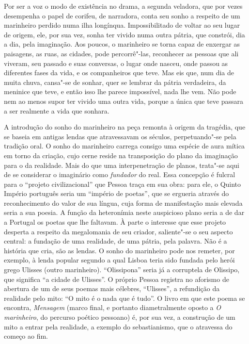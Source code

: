 Por ser a voz o modo de existência no drama,
a segunda veladora, que por
vezes desempenha o papel de corifeu,
de narradora, conta seu sonho a
respeito de um marinheiro perdido numa
ilha longínqua. Impossibilitado
de voltar ao seu lugar de origem, ele, por
sua vez, sonha ter vivido
numa outra pátria, que constrói, dia a dia, pela imaginação. Aos
poucos, o marinheiro se torna capaz de enxergar
as paisagens, as ruas,
as cidades, pode percorrê"-las, 
reconhecer as pessoas que ali viveram,
seu passado e suas conversas, o lugar onde nasceu, onde passou as
diferentes fases da vida, e os companheiros
que teve. Mas eis que, num
dia de muita chuva, cansa"-se de sonhar, quer se lembrar da pátria
verdadeira, da meninice que teve, e então isso
lhe parece impossível,
nada lhe vem. Não pode nem ao menos 
supor ter vivido uma outra vida,
porque a única que teve passara a
ser realmente a vida que sonhara. 

A introdução do sonho do marinheiro na peça remonta à
origem da tragédia, que se baseia em antigas lendas 
que atravessavam os
séculos, perpetuando"-se pela tradição oral.
O sonho do marinheiro
carrega consigo uma espécie de aura mítica
em torno da criação, cujo
cerne reside na transposição do plano da imaginação para o da
realidade. Mais do que uma interpenetração de planos, 
trata"-se aqui de
se considerar o imaginário como
\textit{fundador} do real. Essa
concepção é fulcral para o “projeto 
civilizacional” que Pessoa traça em
sua obra: para ele, o Quinto Império 
português seria um “império de
poetas”, que se ergueria através do 
reconhecimento do valor de sua
língua, cuja forma de manifestação mais
elevada seria a sua poesia. A
função da heteronímia neste auspicioso plano 
seria a de dar a Portugal
os poetas que lhe faltavam. À parte o interesse
que esse projeto
desperta a respeito da megalomania de
seu criador, saliente"-se o seu
aspecto central: a fundação de uma
realidade, de uma pátria, pela
palavra. Não é a história que cria, 
são as lendas. O sonho do
marinheiro pode nos remeter, por exemplo,
à lenda popular segundo a
qual Lisboa teria sido fundada pelo herói grego Ulisses (outro
marinheiro). “Olissipona” seria já a corruptela de Olissipo, que
significa “a cidade de Ulisses”.
O próprio Pessoa registra no aforismo de abertura
de um de seus poemas mais célebres, ``Ulisses'', a refundição da 
realidade pelo mito: ``O mito é o nada que é tudo”. O
livro em que este poema se encontra,
\textit{Mensagem} (marco final, e
portanto diametralmente oposto a 
\textit{O marinheiro}, do percurso poético pessoano) é, por
sua vez, a construção de um mito a entrar
pela realidade, a exemplo do
sebastianismo, que o atravessa do começo ao fim. 

